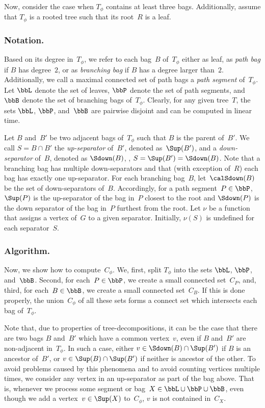 Now, consider the case when $T_\phi$ contains at least three bags.
Additionally, assume that $T_\phi$ is a rooted tree such that its root~$R$ is a leaf.

\subsubsection{Notation.}
Based on its degree in~$T_\phi$, we refer to each bag~$B$ of~$T_\phi$ either as leaf, as \emph{path bag} if $B$ has degree~$2$, or as \emph{branching bag} if $B$ has a degree larger than~$2$.
Additionally, we call a maximal connected set of path bags a \emph{path segment} of~$T_\phi$.
Let $\bbL$ denote the set of leaves, $\bbP$ denote the set of path segments, and $\bbB$ denote the set of branching bags of~$T_\phi$.
Clearly, for any given tree~$T$, the sets $\bbL$, $\bbP$, and~$\bbB$ are pairwise disjoint and can be computed in linear time.

Let $B$ and~$B'$ be two adjacent bags of~$T_\phi$ such that $B$ is the parent of~$B'$.
We call $S = B \cap B'$ the \emph{up-separator} of~$B'$, denoted as~$\Sup(B')$, and a \emph{down-separator} of~$B$, denoted as $\Sdown(B)$, \ie, $S = \Sup(B') = \Sdown(B)$.
Note that a branching bag has multiple down-separators and that (with exception of~$R$) each bag has exactly one up-separator.
For each branching bag~$B$, let~$\calSdown(B)$ be the set of down-separators of~$B$.
Accordingly, for a path segment~$P \in \bbP$, $\Sup(P)$ is the up-separator of the bag in~$P$ closest to the root and $\Sdown(P)$ is the down separator of the bag in~$P$ furthest from the root.
Let $\nu$ be a function that assigns a vertex of~$G$ to a given separator.
Initially, $\nu(S)$ is undefined for each separator~$S$.


\subsubsection{Algorithm.}
Now, we show how to compute~$C_\phi$.
We, first, split $T_\phi$ into the sets $\bbL$, $\bbP$, and~$\bbB$.
Second, for each~$P \in \bbP$, we create a small connected set~$C_P$, and, third, for each~$B \in \bbB$, we create a small connected set~$C_B$.
If this is done properly, the union~$C_\phi$ of all these sets forms a connect set which intersects each bag of~$T_\phi$.

Note that, due to properties of tree-decompositions, it can be the case that there are two bags $B$ and~$B'$ which have a common vertex~$v$, even if $B$ and~$B'$ are non-adjacent in~$T_\phi$.
In such a case, either $v \in \Sdown(B) \cap \Sup(B')$ if $B$ is an ancestor of~$B'$, or $v \in \Sup(B) \cap \Sup(B')$ if neither is ancestor of the other.
To avoid problems caused by this phenomena and to avoid counting vertices multiple times, we consider any vertex in an up-separator as part of the bag above.
That is, whenever we process some segment or bag~$X \in \bbL \cup \bbP \cup \bbB$, even though we add a vertex~$v \in \Sup(X)$ to~$C_\phi$, $v$ is not contained in~$C_X$.


